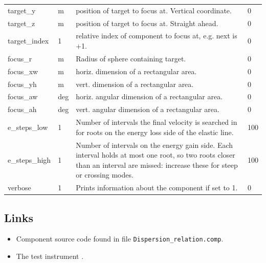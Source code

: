 \begin{longtable}{p{}p{}p{}p{}}
target\_y & m & position of target to focus at. Vertical coordinate. & 0 \\
target\_z & m & position of target to focus at. Straight ahead. & 0 \\
target\_index & 1 & relative index of component to focus at, e.g. next is +1. & 0 \\
focus\_r & m & Radius of sphere containing target. & 0 \\
focus\_xw & m & horiz. dimension of a rectangular area. & 0 \\
focus\_yh & m & vert.  dimension of a rectangular area. & 0 \\
focus\_aw & deg & horiz. angular dimension of a rectangular area. & 0 \\
focus\_ah & deg & vert.  angular dimension of a rectangular area. & 0 \\
e\_steps\_low & 1 & Number of intervals the final velocity is searched in for roots on the energy loss side of the elastic line. & 100 \\
e\_steps\_high & 1 & Number of intervals on the energy gain side. Each interval holds at most one root, so two roots closer than an interval are missed: increase these for steep or crossing modes. & 100 \\
verbose & 1 & Prints information about the component if set to 1. & 0 \\
\bottomrule
\end{longtable}

\subsection*{Links}
\begin{itemize}
  \item Component source code found in file \texttt{Dispersion\_relation.comp}.
  \item The test instrument .
\end{itemize}
